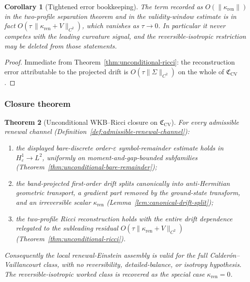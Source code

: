 \documentclass[11pt]{article}
\newtheorem{theorem}{Theorem}[section]
\newtheorem{corollary}[theorem]{Corollary}
\theoremstyle{definition}
\theoremstyle{remark}
\newcommand{\eps}{\varepsilon}
\newcommand{\ren}{\mathrm{ren}}
\newcommand{\CV}{\mathfrak C_{\mathrm{CV}}}
\newcommand{\kren}{\kappa_{\ren}}
\begin{document}
\begin{corollary}[Tightened error bookkeeping]
\label{cor:tightened}
The term recorded as $O(\|\kren\|)$ in the two-profile separation theorem
and in the validity-window estimate is in fact $O(\tau\,\|\kren+V\|_{C^2})$, which
vanishes as $\tau\to0$.  In particular it never competes with the leading curvature
signal, and the reversible-isotropic restriction may be deleted from those
statements.
\end{corollary}

\begin{proof}
Immediate from Theorem~\ref{thm:unconditional-ricci}: the reconstruction error
attributable to the projected drift is $O(\tau\|\Sigma\|_{C^2})$ on the whole of
$\CV$.
\end{proof}

\subsubsection{Closure theorem}
\label{sec:cv-edits}

\begin{theorem}[Unconditional WKB--Ricci closure on $\CV$]
\label{thm:unconditional-wkb-ricci}
For every admissible renewal channel \textup{(Definition~\ref{def:admissible-renewal-channel})}:
\begin{enumerate}[leftmargin=2.6em]
\item the displayed bare-discrete order-$\eps$ symbol-remainder estimate holds in
$H^1_\eps\to L^2$, uniformly on moment-and-gap-bounded subfamilies
\textup{(Theorem~\ref{thm:unconditional-bare-remainder})};
\item the band-projected first-order drift splits canonically into anti-Hermitian
geometric transport, a gradient part removed by the ground-state transform, and an
irreversible scalar $\kren$ \textup{(Lemma~\ref{lem:canonical-drift-split})};
\item the two-profile Ricci reconstruction holds with the entire drift dependence
relegated to the subleading residual $O(\tau\|\kren+V\|_{C^2})$
\textup{(Theorem~\ref{thm:unconditional-ricci})}.
\end{enumerate}
Consequently the local renewal-Einstein assembly is valid for the full
Calder\'on--Vaillancourt class, with no reversibility, detailed-balance, or
isotropy hypothesis.  The reversible-isotropic worked class is recovered as the
special case $\kren=0$.
\end{theorem}
\end{document}
